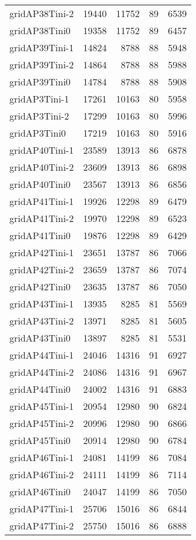 \begin{longtable}{lrrrr}
gridAP38Tini-2 & 19440 & 11752 & 89 & 6539 \\
gridAP38Tini0 & 19358 & 11752 & 89 & 6457 \\
gridAP39Tini-1 & 14824 & 8788 & 88 & 5948 \\
gridAP39Tini-2 & 14864 & 8788 & 88 & 5988 \\
gridAP39Tini0 & 14784 & 8788 & 88 & 5908 \\
gridAP3Tini-1 & 17261 & 10163 & 80 & 5958 \\
gridAP3Tini-2 & 17299 & 10163 & 80 & 5996 \\
gridAP3Tini0 & 17219 & 10163 & 80 & 5916 \\
gridAP40Tini-1 & 23589 & 13913 & 86 & 6878 \\
gridAP40Tini-2 & 23609 & 13913 & 86 & 6898 \\
gridAP40Tini0 & 23567 & 13913 & 86 & 6856 \\
gridAP41Tini-1 & 19926 & 12298 & 89 & 6479 \\
gridAP41Tini-2 & 19970 & 12298 & 89 & 6523 \\
gridAP41Tini0 & 19876 & 12298 & 89 & 6429 \\
gridAP42Tini-1 & 23651 & 13787 & 86 & 7066 \\
gridAP42Tini-2 & 23659 & 13787 & 86 & 7074 \\
gridAP42Tini0 & 23635 & 13787 & 86 & 7050 \\
gridAP43Tini-1 & 13935 & 8285 & 81 & 5569 \\
gridAP43Tini-2 & 13971 & 8285 & 81 & 5605 \\
gridAP43Tini0 & 13897 & 8285 & 81 & 5531 \\
gridAP44Tini-1 & 24046 & 14316 & 91 & 6927 \\
gridAP44Tini-2 & 24086 & 14316 & 91 & 6967 \\
gridAP44Tini0 & 24002 & 14316 & 91 & 6883 \\
gridAP45Tini-1 & 20954 & 12980 & 90 & 6824 \\
gridAP45Tini-2 & 20996 & 12980 & 90 & 6866 \\
gridAP45Tini0 & 20914 & 12980 & 90 & 6784 \\
gridAP46Tini-1 & 24081 & 14199 & 86 & 7084 \\
gridAP46Tini-2 & 24111 & 14199 & 86 & 7114 \\
gridAP46Tini0 & 24047 & 14199 & 86 & 7050 \\
gridAP47Tini-1 & 25706 & 15016 & 86 & 6844 \\
gridAP47Tini-2 & 25750 & 15016 & 86 & 6888 \\

\end{longtable}

